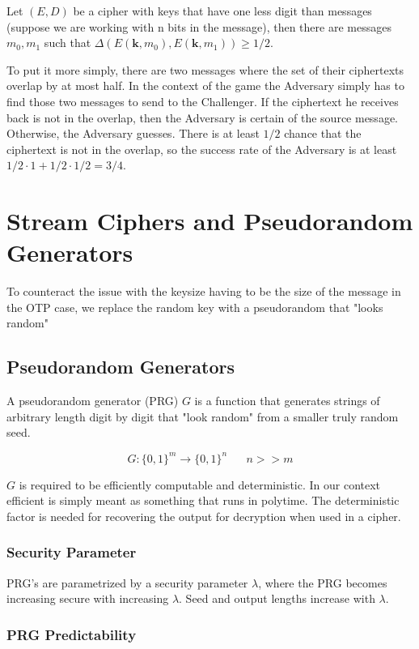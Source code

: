 \documentclass{article}
\begin{document}
\begin{multicols}{2}
Let $(E,D)$ be a cipher with keys that have one less digit than messages (suppose we are working with n bits in the message), then there are messages $m_0, m_1$ such that $\Delta(E(\mathbf{k},m_0), E(\mathbf{k},m_1)) \geq 1/2$.

To put it more simply, there are two messages where the set of their ciphertexts overlap by at most half. In the context of the game the Adversary simply has to find those two messages to send to the Challenger. If the ciphertext he receives back is not in the overlap, then the Adversary is certain of the source message. Otherwise, the Adversary guesses. There is at least $1/2$ chance that the ciphertext is not in the overlap, so the success rate of the Adversary is at least $1/2 \cdot 1 + 1/2 \cdot 1/2 = 3/4$.


\section {Stream Ciphers and Pseudorandom Generators}

To counteract the issue with the keysize having to be the size of the message in the OTP case, we replace the random key with a pseudorandom that "looks random"

\subsection {Pseudorandom Generators}

A pseudorandom generator (PRG) $G$ is a function that generates strings of arbitrary length digit by digit that "look random" from a smaller truly random seed.

$$
G: \{0,1\}^m \rightarrow \{0,1\}^n\;\;\;\;\;\; n >> m
$$

$G$ is required to be efficiently computable and deterministic. In our context efficient is simply meant as something that runs in polytime. The deterministic factor is needed for recovering the output for decryption when used in a cipher. 

\subsubsection {Security Parameter}

PRG's are parametrized by a security parameter $\lambda$, where the PRG becomes increasing secure with increasing $\lambda$. Seed and output lengths increase with $\lambda$.

\subsubsection {PRG Predictability}


\end{multicols}
\end{document}
